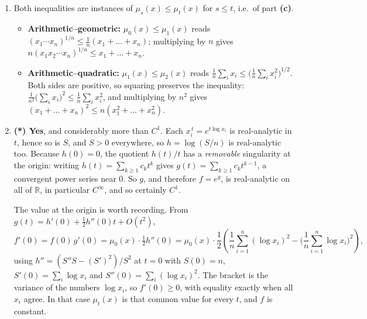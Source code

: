 \begin{exercisesolution}
\begin{enumerate}[label=\textbf{(\alph*)}]
    \textit{Monotonicity.} Differentiating $g = h/t$ for $t \neq 0$,
    \[t^2 g'(t) = t\,h'(t) - h(t) = \frac{t\,S'(t)}{S(t)} - \log\frac{S(t)}{n}.\]
    Now substitute $a_i := x_i^{\,t}$. Then $\log a_i = t\log x_i$, so
    $t\,S'(t) = \sum_i a_i\log a_i$ and $S(t) = \sum_i a_i$, and the displayed quantity becomes
    \[\sum_{i=1}^n\frac{a_i\log a_i}{a_1+\dots+a_n} \ -\ \log\!\left(\frac{a_1+\dots+a_n}{n}\right)
      \ \geq\ 0\]
    by part \textbf{(b)}. Hence $g' \geq 0$ on $t \neq 0$, and by continuity $g$ is non-decreasing
    on all of
    $\mathbb{R}$; so is $f = e^{g}$.

    This is why part \textbf{(b)} was placed where it is: it is not a separate exercise but the
    derivative computation of part \textbf{(c)} in disguise.
  \item Both inequalities are instances of $\mu_s(x) \leq \mu_t(x)$ for $s \leq t$, i.e.\ of
    part \textbf{(c)}.
    \begin{itemize}
      \item \textbf{Arithmetic--geometric:} $\mu_0(x) \leq \mu_1(x)$ reads
        $(x_1\cdots x_n)^{1/n} \leq \tfrac{1}{n}(x_1+\dots+x_n)$; multiplying by $n$ gives
        $n(x_1x_2\cdots x_n)^{1/n} \leq x_1 + \dots + x_n$.
      \item \textbf{Arithmetic--quadratic:} $\mu_1(x) \leq \mu_2(x)$ reads
        $\tfrac1n\sum_i x_i \leq \big(\tfrac1n\sum_i x_i^2\big)^{1/2}$. Both sides are positive,
        so squaring preserves the inequality:
        $\tfrac{1}{n^2}\big(\sum_i x_i\big)^2 \leq \tfrac1n\sum_i x_i^2$, and multiplying by
        $n^2$ gives $(x_1+\dots+x_n)^2 \leq n(x_1^2+\dots+x_n^2)$.
    \end{itemize}
  \item \textbf{(*) Yes}, and considerably more than $C^1$. Each $x_i^{\,t} = e^{t\log x_i}$ is
    real-analytic in $t$, hence so is $S$, and $S > 0$ everywhere, so $h = \log(S/n)$ is
    real-analytic too. Because $h(0) = 0$, the quotient $h(t)/t$ has a \emph{removable}
    singularity at the origin: writing $h(t) = \sum_{k\geq1}c_kt^k$ gives
    $g(t) = \sum_{k\geq1}c_kt^{k-1}$, a convergent power series near $0$. So $g$, and therefore
    $f = e^{g}$, is real-analytic on all of $\mathbb{R}$, in particular $C^\infty$, and so
    certainly $C^1$.

    The value at the origin is worth recording. From $g(t) = h'(0) + \tfrac12 h''(0)t + O(t^2)$,
    \[f'(0) = f(0)\,g'(0) = \mu_0(x)\cdot\tfrac12 h''(0)
      = \mu_0(x)\cdot\frac12\left(\frac{1}{n}\sum_{i=1}^n(\log x_i)^2
        - \Big(\frac1n\sum_{i=1}^n\log x_i\Big)^{\!2}\right),\]
    using $h'' = (S''S - (S')^2)/S^2$ at $t=0$ with $S(0)=n$, $S'(0)=\sum_i\log x_i$ and
    $S''(0)=\sum_i(\log x_i)^2$. The bracket is the variance of the numbers $\log x_i$, so
    $f'(0) \geq 0$, with equality exactly when all $x_i$ agree. In that case $\mu_t(x)$ is that
    common value for every $t$, and $f$ is constant.
\end{enumerate}
\end{exercisesolution}

